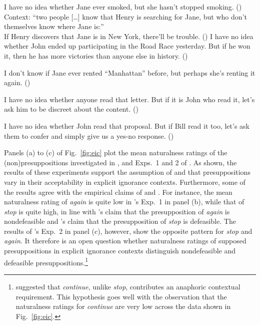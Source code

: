 \documentclass[11pt,fleqn]{article}
\def\verymarginal{{\leavevmode\llap{??}}}
\def\infelic{{\leavevmode\llap{\#}}}
\newcommand{\6}{\mbox{$[\hspace*{-.6mm}[$}}
\newcommand{\9}{\mbox{$]\hspace*{-.6mm}]$}}
\newcommand{\citepos}[1]{\citeauthor{#1}'s \citeyear{#1}}
\begin{document}
\begin{exe}
\ex\label{eic2}
\begin{xlist}
\ex I have no idea whether Jane ever smoked, but she hasn't stopped smoking. \hfill (\citealt[443]{simons01})
\ex Context: ``two people [\ldots] know that Henry is searching for Jane, but who don't themselves know where Jane is:'' \\ If Henry discovers that Jane is in New York, there'll be trouble. \hfill (\citealt[434]{simons01})
\ex I have no idea whether John ended up participating in the
Road Race yesterday. But if he won it, then he has more victories than anyone else in history. \hfill (\citealt[39]{abusch10})
\end{xlist}
\ex\label{eic3}
\begin{xlist}
\ex\infelic I don't know if Jane ever rented ``Manhattan'' before, but perhaps she's renting it again. \hfill (\citealt[443]{simons01})

\ex \verymarginal I have no idea whether anyone read that letter. But if it is John
who read it, let's ask him to be discreet about the content. \hfill (\citealt[40]{abusch10})

\ex \verymarginal I have no idea whether John read that proposal. But if Bill read it too, let's ask them to confer and simply give us a yes-no response. \hfill (\citealt[40]{abusch10})
\end{xlist}
\end{exe}

Panels (a) to (c) of Fig.~\ref{fig:eic} plot the mean naturalness ratings of the (non)presuppositions investigated in \citealt[Exp.~3]{mandelkern-etal2020}, and Exps.~1 and 2 of \citealt{kalomoiros-schwarz2024}. As shown, the results of these experiments support the assumption of \citealt{simons01} and \citealt{abusch10} that presuppositions vary in their acceptability in explicit ignorance contexts. Furthermore, some of the results agree with the empirical claims of \citealt{simons01} and \citealt{abusch10}. For instance, the mean naturalness rating of \emph{again} is quite low in \citepos{kalomoiros-schwarz2024} Exp.~1 in panel (b), while that of \emph{stop} is quite high, in line with \citepos{abusch10} claim that the presupposition of \emph{again} is nondefeasible and \citepos{simons01} claim that the presupposition of \emph{stop} is defeasible. The results of \citepos{kalomoiros-schwarz2024} Exp.~2 in panel (c), however, show the opposite pattern for \emph{stop} and \emph{again}. It therefore is an open question whether naturalness ratings of supposed presuppositions in explicit ignorance contexts distinguish nondefeasible and defeasible presuppositions.\footnote{\citealt[734ff.]{roberts-simons2024} suggested that \emph{continue}, unlike \emph{stop}, contributes an anaphoric contextual requirement. This hypothesis goes well with the observation that the naturalness ratings for \emph{continue} are very low across the data shown in Fig.~\ref{fig:eic}.}
\end{document}
